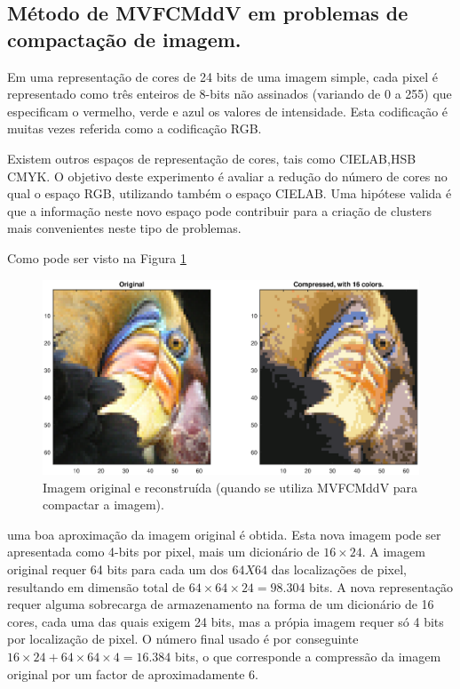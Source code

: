 \documentclass[12pt]{article}
\begin{document}
\subsection{Método de MVFCMddV em problemas de compactação de imagem.}

Em uma representação de cores de 24 bits de uma imagem simple, cada pixel é representado como três enteiros de 8-bits não assinados (variando de 0 a 255) que especificam o vermelho, verde e azul os valores de intensidade. Esta codificação é muitas vezes referida como a codificação RGB.

Existem outros espaços de representação de cores, tais como CIELAB,HSB CMYK. O objetivo deste experimento é avaliar a redução do número de cores no qual o espaço RGB, utilizando também o espaço CIELAB. Uma hipótese valida é que a informação neste novo espaço pode contribuir para a criação de clusters mais convenientes neste tipo de problemas.

Como pode ser visto na Figura \ref{fig:image_compress} 
\begin{figure}[h]
\centering
\includegraphics[width=5.5in]{../out/image-compress-16.eps}
\caption{Imagem original e reconstruída (quando se utiliza MVFCMddV para compactar a imagem).}
\label{fig:image_compress}
\end{figure}  
uma boa aproximação da imagem original é obtida. Esta nova imagem pode ser apresentada como 4-bits por pixel, mais um dicionário de $16\times24$. A imagem original requer 64 bits para cada um dos $64X64$ das localizações de pixel, resultando em dimensão total de $64\times64\times24 = 98.304$ bits. A nova representação requer alguma sobrecarga de armazenamento na forma de um dicionário de 16 cores, cada uma das quais exigem 24 bits, mas a própia imagem requer só 4 bits por localização de pixel. O número final usado é por conseguinte $16\times24 + 64\times64\times4 = 16.384$ bits, o que corresponde a compressão da imagem original por um factor de aproximadamente 6.
\end{document}
